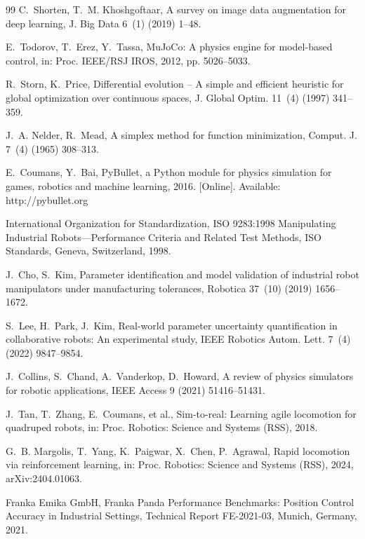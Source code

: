 \documentclass[DTMColor]{ROB-New}
\begin{document}
\begin{thebibliography}{99}
C.~Shorten, T.~M. Khoshgoftaar, A survey on image data augmentation for deep learning, J. Big Data 6~(1) (2019) 1--48.

E.~Todorov, T.~Erez, Y.~Tassa, MuJoCo: A physics engine for model-based control, in: Proc. IEEE/RSJ IROS, 2012, pp. 5026--5033.

R.~Storn, K.~Price, Differential evolution -- A simple and efficient heuristic for global optimization over continuous spaces, J. Global Optim. 11~(4) (1997) 341--359.

J.~A. Nelder, R.~Mead, A simplex method for function minimization, Comput. J. 7~(4) (1965) 308--313.

E.~Coumans, Y.~Bai, PyBullet, a Python module for physics simulation for games, robotics and machine learning, 2016. [Online]. Available: http://pybullet.org

International Organization for Standardization, ISO 9283:1998 Manipulating Industrial Robots—Performance Criteria and Related Test Methods, ISO Standards, Geneva, Switzerland, 1998.

J.~Cho, S.~Kim, Parameter identification and model validation of industrial robot manipulators under manufacturing tolerances, Robotica 37~(10) (2019) 1656--1672.

S.~Lee, H.~Park, J.~Kim, Real-world parameter uncertainty quantification in collaborative robots: An experimental study, IEEE Robotics Autom. Lett. 7~(4) (2022) 9847--9854.

J.~Collins, S.~Chand, A.~Vanderkop, D.~Howard, A review of physics simulators for robotic applications, IEEE Access 9 (2021) 51416--51431.

J.~Tan, T.~Zhang, E.~Coumans, et al., Sim-to-real: Learning agile locomotion for quadruped robots, in: Proc. Robotics: Science and Systems (RSS), 2018.

G.~B. Margolis, T.~Yang, K.~Paigwar, X.~Chen, P.~Agrawal, Rapid locomotion via reinforcement learning, in: Proc. Robotics: Science and Systems (RSS), 2024, arXiv:2404.01063.

Franka Emika GmbH, Franka Panda Performance Benchmarks: Position Control Accuracy in Industrial Settings, Technical Report FE-2021-03, Munich, Germany, 2021.


\end{thebibliography}
\end{document}
